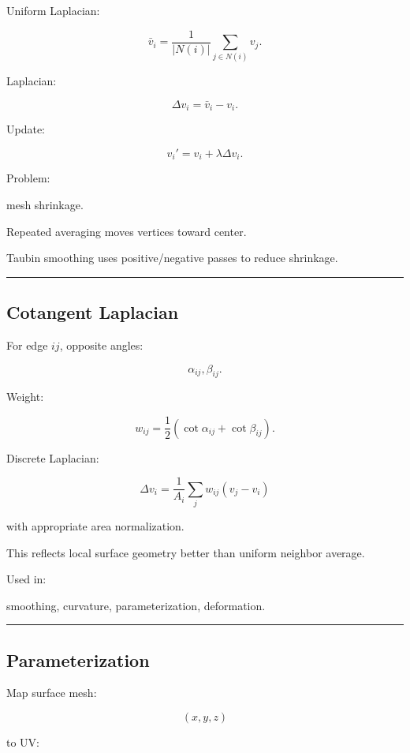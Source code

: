 Uniform Laplacian:

\[
\bar v_i=
\frac1{|N(i)|}
\sum_{j\in N(i)}
v_j.
\]

Laplacian:

\[
\Delta v_i=
\bar v_i-v_i.
\]

Update:

\[
\boxed{
v_i'
=
v_i+
\lambda\Delta v_i.
}
\]

Problem:

mesh shrinkage.

Repeated averaging moves vertices toward center.

Taubin smoothing uses positive/negative passes to reduce shrinkage.

\begin{center}\rule{0.5\linewidth}{0.5pt}\end{center}

\subsection{Cotangent Laplacian}\label{04-visual-computing-ii-ch041-cotangent-laplacian}

For edge \(ij\), opposite angles:

\[
\alpha_{ij},\beta_{ij}.
\]

Weight:

\[
\boxed{
w_{ij}
=
\frac12
(
\cot\alpha_{ij}
+
\cot\beta_{ij}
).
}
\]

Discrete Laplacian:

\[
\Delta v_i
=
\frac1{A_i}
\sum_{j}
w_{ij}(v_j-v_i)
\]

with appropriate area normalization.

This reflects local surface geometry better than uniform neighbor average.

Used in:

smoothing, curvature, parameterization, deformation.

\begin{center}\rule{0.5\linewidth}{0.5pt}\end{center}

\subsection{Parameterization}\label{04-visual-computing-ii-ch041-parameterization}

Map surface mesh:

\[
(x,y,z)
\]

to UV:

